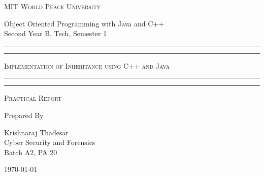 \documentclass[11pt]{article}
\begin{document}
\begin{titlepage}
	\centering


	\huge\textsc{
		MIT World Peace University
	}\\

	\vspace{0.75\baselineskip} %

	\LARGE{
		Object Oriented Programming with Java and C++\\
		Second Year B. Tech, Semester 1
	}

	\vfill %


	\rule{\textwidth}{1.6pt}\vspace*{-\baselineskip}\vspace*{2pt}
	\rule{\textwidth}{0.6pt}
	\vspace{0.75\baselineskip} %



	\huge{\textsc{
			Implementation of Inheritance using C++ and Java
		}} \\



	\vspace{0.5\baselineskip} %
	\rule{\textwidth}{0.6pt}\vspace*{-\baselineskip}\vspace*{2.8pt}
	\rule{\textwidth}{1.6pt}

	\vspace{1\baselineskip} %


	\LARGE\textsc{
		Practical Report
	} %
	\vfill


	Prepared By
	\vspace{0.5\baselineskip} %

	\Large{
		Krishnaraj Thadesar \\
		Cyber Security and Forensics\\
		Batch A2, PA 20
	}


	\vspace{0.5\baselineskip} %
	\today

\end{titlepage}
\end{document}
